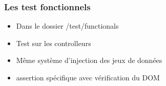 \documentclass{beamer}
\begin{document}
\begin{frame}
    \frametitle{Les test fonctionnels}
    \begin{itemize}
        \item Dans le dossier /test/functionals
        \item Test sur les controlleurs
        \item Même système d'injection des jeux de données
        \item assertion spécifique avec vérification du DOM
    \end{itemize}
\end{frame}
\end{document}
